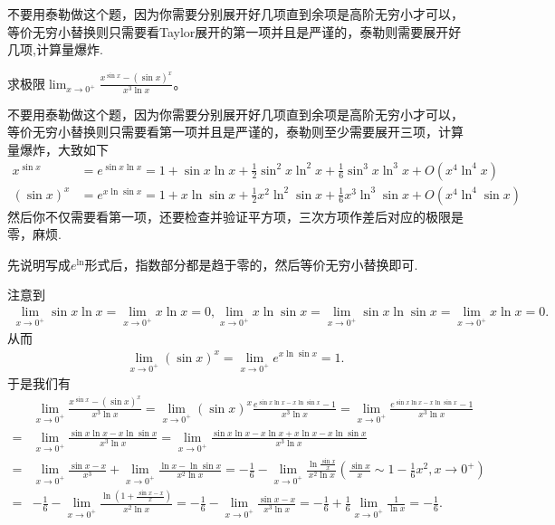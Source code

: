 \documentclass[lang=cn,newtx,10pt,scheme=chinese]{elegantbook}
\begin{document}
\begin{remark}
不要用泰勒做这个题，因为你需要分别展开好几项直到余项是高阶无穷小才可以，等价无穷小替换则只需要看Taylor展开的第一项并且是严谨的，泰勒则需要展开好几项,计算量爆炸.  
\end{remark}
\begin{example}
求极限\(\lim_{x\rightarrow0^{+}}\frac{x^{\sin x}-(\sin x)^{x}}{x^{3}\ln x}\)。
\end{example}
\begin{remark}
不要用泰勒做这个题，因为你需要分别展开好几项直到余项是高阶无穷小才可以，等价无穷小替换则只需要看第一项并且是严谨的，泰勒则至少需要展开三项，计算量爆炸，大致如下
\begin{align*}
x^{\sin x}&=e^{\sin x\ln x}=1+\sin x\ln x+\frac{1}{2}\sin^{2}x\ln^{2}x+\frac{1}{6}\sin^{3}x\ln^{3}x+O(x^{4}\ln^{4}x)\\
(\sin x)^{x}&=e^{x\ln\sin x}=1 + x\ln\sin x+\frac{1}{2}x^{2}\ln^{2}\sin x+\frac{1}{6}x^{3}\ln^{3}\sin x+O(x^{4}\ln^{4}\sin x)
\end{align*}
然后你不仅需要看第一项，还要检查并验证平方项，三次方项作差后对应的极限是零，麻烦. 
\end{remark}
\begin{note}
先说明写成\(e^{\ln}\)形式后，指数部分都是趋于零的，然后等价无穷小替换即可.
\end{note}
\begin{solution}
注意到\begin{align*}
\lim_{x\rightarrow0^{+}}\sin x\ln x=\lim_{x\rightarrow0^{+}}x\ln x = 0, \lim_{x\rightarrow0^{+}}x\ln\sin x=\lim_{x\rightarrow0^{+}}\sin x\ln\sin x=\lim_{x\rightarrow0^{+}}x\ln x = 0.
\end{align*}
从而
\begin{align*}
\lim_{x\rightarrow 0^+} (\sin x)^x=\lim_{x\rightarrow 0^+} e^{x\ln\sin x}=1.
\end{align*}
于是我们有
\begin{align*}
&\lim_{x\rightarrow0^{+}}\frac{x^{\sin x}-(\sin x)^{x}}{x^{3}\ln x}=\lim_{x\rightarrow0^{+}}(\sin x)^{x}\frac{e^{\sin x\ln x - x\ln\sin x}-1}{x^{3}\ln x}=\lim_{x\rightarrow0^{+}}\frac{e^{\sin x\ln x - x\ln\sin x}-1}{x^{3}\ln x}\\
=&\lim_{x\rightarrow0^{+}}\frac{\sin x\ln x - x\ln\sin x}{x^{3}\ln x}=\lim_{x\rightarrow0^{+}}\frac{\sin x\ln x - x\ln x + x\ln x - x\ln\sin x}{x^{3}\ln x}\\
=&\lim_{x\rightarrow0^{+}}\frac{\sin x - x}{x^{3}}+\lim_{x\rightarrow0^{+}}\frac{\ln x - \ln\sin x}{x^{2}\ln x}=-\frac{1}{6}-\lim_{x\rightarrow0^{+}}\frac{\ln\frac{\sin x}{x}}{x^{2}\ln x}(\frac{\sin x}{x}\sim1 - \frac{1}{6}x^{2},x\to 0^+)\\
=&-\frac{1}{6}-\lim_{x\rightarrow0^{+}}\frac{\ln(1 + \frac{\sin x - x}{x})}{x^{2}\ln x}=-\frac{1}{6}-\lim_{x\rightarrow0^{+}}\frac{\sin x - x}{x^{3}\ln x}=-\frac{1}{6}+\frac{1}{6}\lim_{x\rightarrow0^{+}}\frac{1}{\ln x}=-\frac{1}{6}.
\end{align*}
\end{solution}
\end{document}
